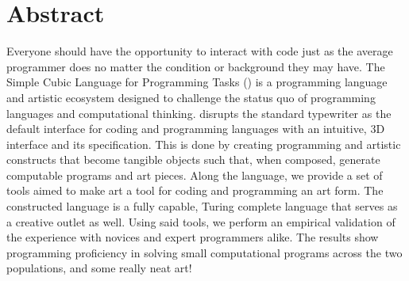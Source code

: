 
\chapter{Abstract}

Everyone should have the opportunity to interact with code just as the average programmer does no matter the condition or background they may have.
The Simple Cubic Language for Programming Tasks (\sculpt) is a programming language and artistic ecosystem designed to challenge the status quo of programming languages and computational thinking.
\sculpt disrupts the standard typewriter as the default interface for coding and programming languages with an intuitive, 3D interface and its specification.
This is done by creating programming and artistic constructs that become tangible objects such that, when composed, generate computable programs and art pieces.
Along the language, we provide a set of tools aimed to make art a tool for coding and programming an art form.
The constructed language is a fully capable, Turing complete language that serves as a creative outlet as well.
Using said tools, we perform an empirical validation of the experience with novices and expert programmers alike.
The results show programming proficiency in solving small computational programs across the two populations, and some really neat art!

\endinput

